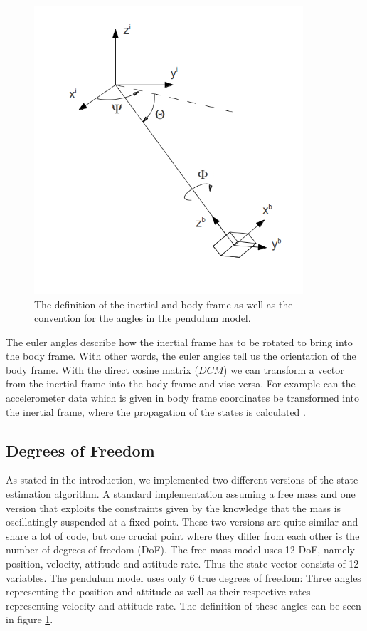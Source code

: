  \begin{figure}[h]
\begin{center}
\includegraphics[width=10cm]{pictures/sketch_coordinate_systems.png}
\caption{The definition of the inertial and body frame as well as the convention for the angles in the pendulum model.}
\label{dof}
\end{center}
\end{figure}

The euler angles describe how the inertial frame has to be rotated to bring into the body frame. With other words, the euler angles tell us the orientation of the body frame. With the direct cosine matrix ($DCM$) we can transform a vector from the inertial frame into the body frame and vise versa. For example can the accelerometer data which is given in body frame coordinates be transformed into the inertial frame, where the propagation of the states is calculated \cite{andrews2007}.

\subsection*{Degrees of Freedom}
As stated in the introduction, we implemented two different versions of the state estimation algorithm. A standard implementation assuming a free mass and one version that exploits the constraints given by the knowledge that the mass is oscillatingly suspended at a fixed point. These two versions are quite similar and share a lot of code, but one crucial point where they differ from each other is the number of degrees of freedom (DoF). The free mass model uses 12 DoF, namely position, velocity, attitude and attitude rate. Thus the state vector consists of 12 variables. The pendulum model uses only 6 true degrees of freedom: Three angles representing the position and attitude as well as their respective rates representing velocity and attitude rate. The definition of these angles can be seen in figure \ref{dof}.



